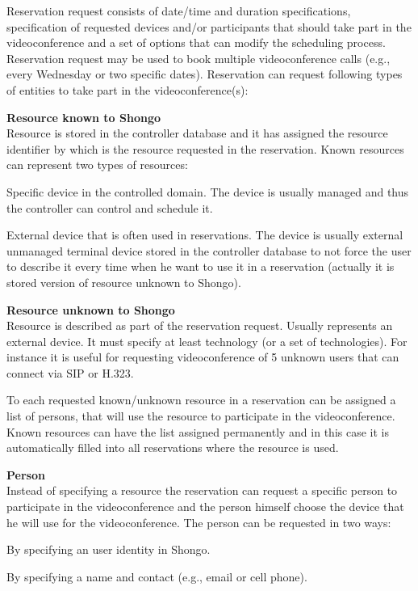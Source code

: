 Reservation request consists of date/time and duration specifications, specification of requested devices and/or participants that should take part in the videoconference and a set of options that can modify the scheduling process. Reservation request may be used to book multiple videoconference calls (e.g., every Wednesday or two specific dates). Reservation can request following types of entities to take part in the videoconference(s):
\begin{compactenum}
\item \textbf{Resource known to Shongo} \\
  Resource is stored in the controller database and it has assigned 
  the resource identifier by which is the resource requested in 
  the reservation. Known resources can represent two types of resources:
  \begin{compactenum}
  \item Specific device in the controlled domain. The device is usually 
  managed and thus the controller can control and schedule it.
  \item External device that is often used in reservations. The device is 
  usually external unmanaged terminal device stored in the controller database
  to not force the user to describe it every time when he want to use it in 
  a reservation (actually it is stored version of resource unknown to Shongo).
  \end{compactenum}
\item \textbf{Resource unknown to Shongo} \\
  Resource is described as part of the reservation request. Usually 
  represents an external device. It must specify at least technology (or a set 
  of technologies). For instance it is useful for requesting videoconference 
  of 5 unknown users that can connect via SIP or H.323.
  
  To each requested known/unknown resource in a reservation can be assigned a 
  list of persons, that will use the resource to participate in the 
  videoconference. Known resources can have the list assigned permanently 
  and in this case it is automatically filled into all reservations where the 
  resource is used.  
\item \textbf{Person} \\
  Instead of specifying a resource the reservation can request a specific 
  person to participate in the videoconference and the person himself choose
  the device that he will use for the videoconference. The person can be 
  requested in two ways:
  \begin{compactenum}
  \item By specifying an user identity in Shongo.
  \item By specifying a name and contact (e.g., email or cell phone).
  \end{compactenum}
\end{compactenum}
